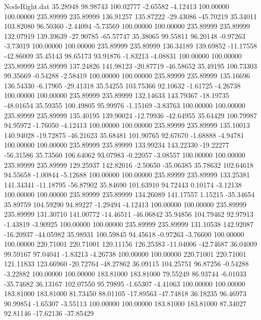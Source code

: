 \begin{filecontents}{NodeRight.dat}
  35.28948   98.98743  100.02777    -2.65582   -4.12413  100.00000  100.00000  235.89999  235.89999  136.91257  135.87222  -29.43086  -45.70219
  35.34011  103.82080   96.50360    -2.44094   -5.73569  100.00000  100.00000  235.89999  235.89999  132.07919  139.39639  -27.90785  -65.57747
  35.38065   99.55811   96.20148    -0.97263   -3.73019  100.00000  100.00000  235.89999  235.89999  136.34189  139.69852  -11.17558  -42.86009
  35.45143   98.65173   93.91876    -1.83213   -4.08831  100.00000  100.00000  235.89999  235.89999  137.24826  141.98123  -20.87719  -46.58652
  35.49195  100.73303   99.35669    -0.54288   -2.58419  100.00000  100.00000  235.89999  235.89999  135.16696  136.54330   -6.17905  -29.41318
  35.54255  103.75366   92.10632    -1.61725   -4.26738  100.00000  100.00000  235.89999  235.89999  132.14633  143.79367  -18.19735  -48.01654
  35.59355  100.49805   95.99976    -1.15169   -3.83763  100.00000  100.00000  235.89999  235.89999  135.40195  139.90024  -12.79936  -42.64955
  35.64429  100.79987   94.95972    -1.76050   -4.12413  100.00000  100.00000  235.89999  235.89999  135.10013  140.94028  -19.72875  -46.21623
  35.68481  101.90765   92.67670    -1.68888   -4.94781  100.00000  100.00000  235.89999  235.89999  133.99234  143.22330  -19.22277  -56.31586
  35.73560  106.64062   93.07983    -0.22057   -3.08557  100.00000  100.00000  235.89999  235.89999  129.25937  142.82016   -2.50650  -35.06385
  35.78632  102.64618   94.55658    -1.00844   -5.12688  100.00000  100.00000  235.89999  235.89999  133.25381  141.34341  -11.18795  -56.87902
  35.84690  101.63910   94.72443     0.10174   -3.12138  100.00000  100.00000  235.89999  235.89999  134.26089  141.17557    1.15215  -35.34654
  35.89759  104.59290   94.89227    -1.29494   -4.12413  100.00000  100.00000  235.89999  235.89999  131.30710  141.00772  -14.46511  -46.06842
  35.94856  104.79462   92.97913    -1.43819   -3.90925  100.00000  100.00000  235.89999  235.89999  131.10538  142.92087  -16.20937  -44.05982
  35.98931  100.59845   94.45618    -0.97263   -3.76600  100.00000  100.00000  220.71001  220.71001  120.11156  126.25383  -11.04006  -42.74687
  36.04009   99.59167   97.04041    -1.83213   -4.26738  100.00000  100.00000  220.71001  220.71001  121.11833  123.66960  -20.72764  -48.27862
  36.09115  104.25751   96.87256    -0.54288   -3.22882  100.00000  100.00000  183.81000  183.81000   79.55249   86.93744   -6.01033  -35.74682
  36.13167  102.07550   95.79895    -1.65307   -4.41063  100.00000  100.00000  183.81000  183.81000   81.73450   88.01105  -17.89563  -47.74818
  36.18235   96.46973   90.99854    -1.65307   -3.55113  100.00000  100.00000  183.81000  183.81000   87.34027   92.81146  -17.62136  -37.85429

\end{filecontents}
